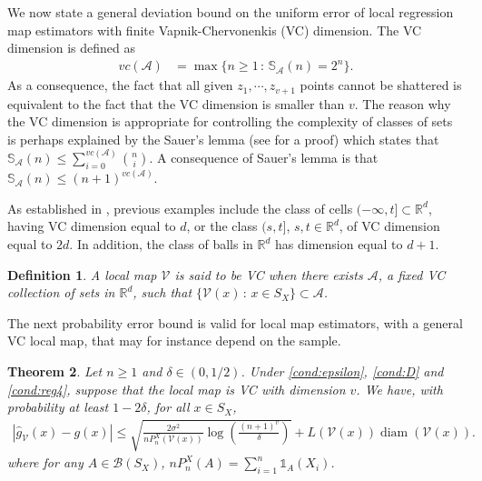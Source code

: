 \documentclass[paper=a4, fontsize=11pt]{scrartcl}
\newcommand{\diam}{\operatorname{diam}}
\newcommand{\ind}{\mathds{1}}
\newcommand{\PP}{\mathbb{P}}
\newcommand{\RR}{\mathbb{R}}
\newtheorem{theorem}{Theorem}
\newtheorem{definition}[theorem]{Definition}
\begin{document}
We now state a general deviation bound on the uniform error of local regression map estimators with finite Vapnik-Chervonenkis (VC) dimension. The VC dimension is defined as 
\begin{align*}
  vc(\mathcal A)  &= \max \{ n\geq 1 \, :\, \mathbb S_\mathcal A(n) 
 = 2^n  \}. 
\end{align*}
As a consequence, the fact that all given $z_1,\cdots , z_{v+1} $ points cannot be shattered is equivalent to the fact that the VC dimension is smaller than $v$. The reason why the VC dimension is appropriate for controlling the complexity of classes of sets is perhaps explained by the Sauer's lemma (see \cite{lugosi2002pattern} for a proof) which states that
$\mathbb{S}_{\mathcal{A}}(n)  \leq  \sum_{i=0} ^{vc(\mathcal{A})} \binom{n}{i}.$ %
  A consequence of Sauer's lemma is that 
  $\mathbb S_\mathcal A(n) \leq (n+1)^{vc(\mathcal A) }.$

As established in \cite{wenocur1981some}, previous examples include the class of cells $(-\infty , t]\subset \mathbb R^d$, having VC dimension equal to $d$, or the class $( s , t]$, $s,t\in \RR^d$, of VC dimension equal to $2d$. In addition, the class of balls in $\mathbb R^d$ has dimension equal to $d+1$. 
\begin{definition}
 A local map $\mathcal V$ is said to be VC when there exists $\mathcal A$, a fixed VC collection of sets in $\mathbb R^d$, such that $\{\mathcal V (x) \, :\, x\in S_X\} \subset \mathcal A$.
\end{definition}


The next probability error bound is valid for local map estimators, with a general VC local map, that may for instance depend on the sample.

\begin{theorem}\label{th:general}
Let $n\geq 1$ and $\delta \in (0,1/2) $. Under \ref{cond:epsilon}, \ref{cond:D} and \ref{cond:reg4}, suppose that the local map is VC with dimension $v$. We have, with probability at least $1 - 2 \delta $, for all $x\in S_X$,
        \begin{align*}
       |  \hat g_{\mathcal V}(x) - g(x)| \leq \sqrt{\frac{ 2 \sigma^2} { n P_n^X(\mathcal V (x))  } \log\left( \frac{ (n+1) ^v }{\delta} \right) } + L(\mathcal V(x)  ) \diam  (\mathcal V(x) )  .
    \end{align*}
    where for any $A\in \mathcal B(S_X)$, $n P_n^X(A)  = \sum_{i=1} ^n \ind _A(X_i) $.
\end{theorem}
\end{document}
